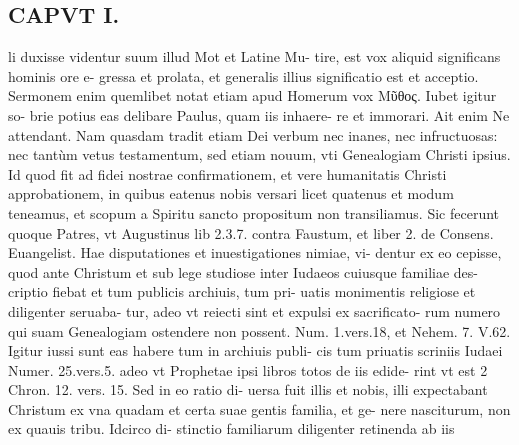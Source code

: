 \documentclass{article}
\begin{document}
\begin{pages}
\section*{CAPVT I. }
\marginpar{[ p.11 ]}\pstart li duxisse videntur suum illud Mot et Latine Mu- tire, est vox aliquid significans hominis ore e- gressa et prolata, et generalis illius significatio est et acceptio. Sermonem enim quemlibet notat etiam apud Homerum vox Μῦθος. Iubet igitur so- brie potius eas delibare Paulus, quam iis inhaere- re et immorari. Ait enim Ne attendant. Nam quasdam tradit etiam Dei verbum nec inanes, nec infructuosas: nec tantùm vetus testamentum, sed etiam nouum, vti Genealogiam Christi ipsius. Id quod fit ad fidei nostrae confirmationem, et vere humanitatis Christi approbationem, in quibus eatenus nobis versari licet quatenus et modum teneamus, et scopum a Spiritu sancto propositum non transiliamus. Sic fecerunt quoque Patres, vt Augustinus lib 2.3.7. contra Faustum, et liber 2. de Consens. Euangelist.  \pend\pstart Hae disputationes et inuestigationes nimiae, vi- dentur ex eo cepisse, quod ante Christum et sub lege studiose inter Iudaeos cuiusque familiae des- criptio fiebat et tum publicis archiuis, tum pri- uatis monimentis religiose et diligenter seruaba- tur, adeo vt reiecti sint et expulsi ex sacrificato- rum numero qui suam Genealogiam ostendere non possent. Num. 1.vers.18, et Nehem. 7. V.62. Igitur iussi sunt eas habere tum in archiuis publi- cis tum priuatis scriniis Iudaei Numer. 25.vers.5. adeo vt Prophetae ipsi libros totos de iis edide- rint vt est 2 Chron. 12. vers. 15. Sed in eo ratio di- uersa fuit illis et nobis, illi expectabant Christum ex vna quadam et certa suae gentis familia, et ge- nere nasciturum, non ex quauis tribu. Idcirco di- stinctio familiarum diligenter retinenda ab iis  \pend

\end{pages}
\end{document}
